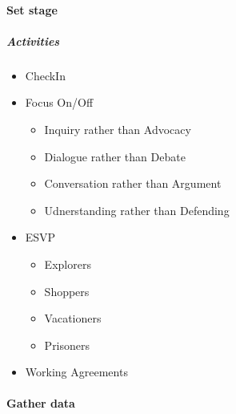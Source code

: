 \documentclass[letterpaper,10pt,english]{jupyterBook}
\begin{document}
\paragraph{Set stage}
\label{\detokenize{APM/agile:set-stage}}

\subparagraph{Activities}
\label{\detokenize{APM/agile:activities}}\begin{itemize}
\item {} 
\sphinxAtStartPar
Check\sphinxhyphen{}In

\item {} 
\sphinxAtStartPar
Focus On/Off
\begin{itemize}
\item {} 
\sphinxAtStartPar
Inquiry rather than Advocacy

\item {} 
\sphinxAtStartPar
Dialogue rather than Debate

\item {} 
\sphinxAtStartPar
Conversation rather than Argument

\item {} 
\sphinxAtStartPar
Udnerstanding rather than Defending

\end{itemize}

\item {} 
\sphinxAtStartPar
ESVP
\begin{itemize}
\item {} 
\sphinxAtStartPar
Explorers

\item {} 
\sphinxAtStartPar
Shoppers

\item {} 
\sphinxAtStartPar
Vacationers

\item {} 
\sphinxAtStartPar
Prisoners

\end{itemize}

\item {} 
\sphinxAtStartPar
Working Agreements

\end{itemize}


\paragraph{Gather data}
\label{\detokenize{APM/agile:gather-data}}
\end{document}
